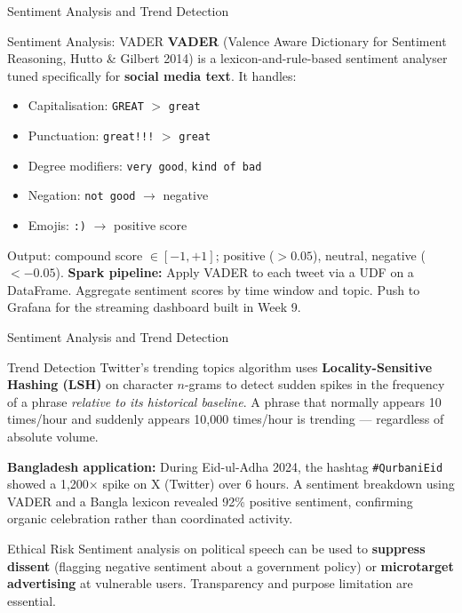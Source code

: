 \documentclass[aspectratio=169,10pt]{beamer}
\begin{document}
\begin{frame}{Sentiment Analysis and Trend Detection}
 
      \begin{block}{Sentiment Analysis: VADER}
        \textbf{VADER} (Valence Aware Dictionary for Sentiment Reasoning, Hutto \& Gilbert 2014) is a lexicon-and-rule-based sentiment analyser tuned specifically for \textbf{social media text}.  It handles:
        \begin{itemize}
          \item Capitalisation: \texttt{GREAT} $>$ \texttt{great}
          \item Punctuation: \texttt{great!!!} $>$ \texttt{great}
          \item Degree modifiers: \texttt{very good}, \texttt{kind of bad}
          \item Negation: \texttt{not good} $\to$ negative
          \item Emojis: \texttt{:)} $\to$ positive score
        \end{itemize}
        Output: compound score $\in [-1, +1]$; positive ($>0.05$), neutral, negative ($<-0.05$).
        \vspace{4pt}
        \textbf{Spark pipeline:}  Apply VADER to each tweet via a UDF on a DataFrame.  Aggregate sentiment scores by time window and topic.  Push to Grafana for the streaming dashboard built in Week 9.
      \end{block}
 
\end{frame}


\begin{frame}{Sentiment Analysis and Trend Detection}
 
      \begin{exampleblock}{Trend Detection}
        \small Twitter's trending topics algorithm uses \textbf{Locality-Sensitive Hashing (LSH)} on character $n$-grams to detect sudden spikes in the frequency of a phrase \textit{relative to its historical baseline}.  A phrase that normally appears 10 times/hour and suddenly appears 10{,}000 times/hour is trending --- regardless of absolute volume.
        \vspace{6pt}

        \textbf{Bangladesh application:} During Eid-ul-Adha 2024, the hashtag \texttt{\#QurbaniEid} showed a 1{,}200× spike on X (Twitter) over 6 hours.  A sentiment breakdown using VADER and a Bangla lexicon revealed 92\% positive sentiment, confirming organic celebration rather than coordinated activity.
      \end{exampleblock}
      \vspace{4pt}
      \begin{alertblock}{Ethical Risk}
        \small Sentiment analysis on political speech can be used to \textbf{suppress dissent} (flagging negative sentiment about a government policy) or \textbf{microtarget advertising} at vulnerable users.  Transparency and purpose limitation are essential.
      \end{alertblock}
 
\end{frame}
\end{document}
